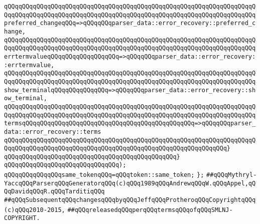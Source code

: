 \verb|qQQqqQQqqQQqqQQqqQQqqQQqqQQqqQQqqQQqqQQqqQQqqQQqqQQqqQQqqQQqqQQqqQQqqQQqqQQqqQQqqQQqqQQqqQQqqQQqqQQqqQQqqQQqqQQqqQQqqQQqqQQqqQQqqQQqqQQqqQQqpreferred_changeqQQq=>qQQqqQQqparser_data::error_recovery::preferred_change,|\newline
\verb|qQQqqQQqqQQqqQQqqQQqqQQqqQQqqQQqqQQqqQQqqQQqqQQqqQQqqQQqqQQqqQQqqQQqqQQqqQQqqQQqqQQqqQQqqQQqqQQqqQQqqQQqqQQqqQQqqQQqqQQqqQQqqQQqqQQqqQQqqQQqerrtermvalueqQQqqQQqqQQqqQQqqQQq=>qQQqqQQqparser_data::error_recovery::errtermvalue,|\newline
\verb|qQQqqQQqqQQqqQQqqQQqqQQqqQQqqQQqqQQqqQQqqQQqqQQqqQQqqQQqqQQqqQQqqQQqqQQqqQQqqQQqqQQqqQQqqQQqqQQqqQQqqQQqqQQqqQQqqQQqqQQqqQQqqQQqqQQqqQQqqQQqshow_terminalqQQqqQQqqQQqqQQq=>qQQqqQQqparser_data::error_recovery::show_terminal,|\newline
\verb|qQQqqQQqqQQqqQQqqQQqqQQqqQQqqQQqqQQqqQQqqQQqqQQqqQQqqQQqqQQqqQQqqQQqqQQqqQQqqQQqqQQqqQQqqQQqqQQqqQQqqQQqqQQqqQQqqQQqqQQqqQQqqQQqqQQqqQQqqQQqtermsqQQqqQQqqQQqqQQqqQQqqQQqqQQqqQQqqQQqqQQqqQQqqQQq=>qQQqqQQqparser_data::error_recovery::terms|\newline
\verb|qQQqqQQqqQQqqQQqqQQqqQQqqQQqqQQqqQQqqQQqqQQqqQQqqQQqqQQqqQQqqQQqqQQqqQQqqQQqqQQqqQQqqQQqqQQqqQQqqQQqqQQqqQQqqQQqqQQqqQQqqQQqqQQqqQQq}|\newline
\verb|qQQqqQQqqQQqqQQqqQQqqQQqqQQqqQQqqQQqqQQqqQQqqQQq}|\newline
\verb|qQQqqQQqqQQqqQQqqQQqqQQqqQQqqQQq);|\newline
\newline
\verb|qQQqqQQqqQQqqQQqsame_tokenqQQq=qQQqtoken::same_token;|\newline
\newline
\verb|};|\newline
\newline
\newline
\newline
\verb|##qQQqMythryl-YaccqQQqParserqQQqGeneratorqQQq(c)qQQq1989qQQqAndrewqQQqW.qQQqAppel,qQQqDavidqQQqR.qQQqTarditiqQQq|\newline
\verb|##qQQqSubsequentqQQqchangesqQQqbyqQQqJeffqQQqProtheroqQQqCopyrightqQQq(c)qQQq2010-2015,|\newline
\verb|##qQQqreleasedqQQqperqQQqtermsqQQqofqQQqSMLNJ-COPYRIGHT.|\newline

